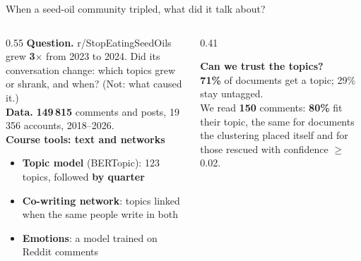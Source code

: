 \documentclass[aspectratio=169,10pt]{beamer}
\newcommand{\key}[1]{{\color{warm}\textbf{#1}}}
\begin{document}
\begin{frame}{When a seed-oil community tripled, what did it talk about?}
\begin{columns}[T]
\begin{column}{0.55\textwidth}
\textbf{Question.} r/StopEatingSeedOils grew \key{3$\times$} from 2023 to 2024. Did its conversation change: which topics grew or shrank, and when? (Not: what caused it.)\\[5pt]
\textbf{Data.} \key{149\,815} comments and posts, 19\,356 accounts, 2018--2026.\\[5pt]
\textbf{Course tools: text and networks}
\begin{itemize}\setlength{\itemsep}{1pt}
\item \textbf{Topic model} (BERTopic): 123 topics, followed \key{by quarter}
\item \textbf{Co-writing network}: topics linked when the same people write in both
\item \textbf{Emotions}: a model trained on Reddit comments
\end{itemize}
\end{column}
\begin{column}{0.41\textwidth}
\colorbox{accent!8}{\parbox{0.94\linewidth}{\small\textbf{Can we trust the topics?}\\[3pt]
\key{71\%} of documents get a topic; 29\% stay untagged.\\[3pt]
We read \key{150} comments: \key{80\%} fit their topic, the same for documents the clustering placed itself and for those rescued with confidence $\geq$ 0.02.}}
\end{column}
\end{columns}
\end{frame}
\end{document}
